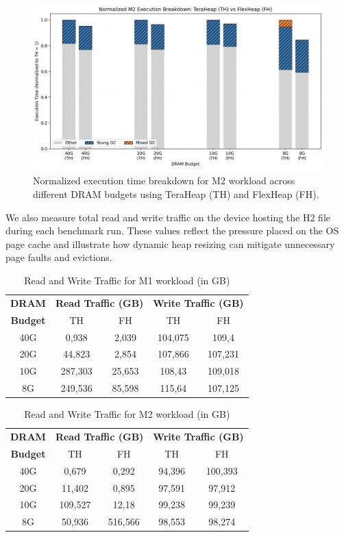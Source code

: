 \begin{figure}[htbp]
  \centering
  \includegraphics[width=0.95\linewidth]{fig/M2_exec.png}
  \caption{Normalized execution time breakdown for M2 workload across different DRAM budgets using TeraHeap (TH) and FlexHeap (FH).}
  \label{fig:m2-exec}
\end{figure}

We also measure total read and write traffic on the device hosting the H2 file during each benchmark run. 
These values reflect the pressure placed on the OS page cache and illustrate how dynamic heap resizing 
can mitigate unnecessary page faults and evictions.

\begin{table}[h]
\centering
\caption{Read and Write Traffic for M1 workload (in GB)}
\label{tab:m1-traffic}
\begin{tabular}{|c|cc|cc|}
\hline
\textbf{DRAM} & \multicolumn{2}{c|}{\textbf{Read Traffic (GB)}} & \multicolumn{2}{c|}{\textbf{Write Traffic (GB)}} \\
\textbf{Budget} & TH & FH & TH & FH \\
\hline
40G & 0,938 & 2,039 & 104,075  & 109,4 \\
20G & 44,823 & 2,854 & 107,866 & 107,231 \\
10G & 287,303 & 25,653 & 108,43 & 109,018 \\
8G  & 249,536 & 85,598 & 115,64 & 107,125 \\
\hline
\end{tabular}
\end{table}

\begin{table}[h]
\centering
\caption{Read and Write Traffic for M2 workload (in GB)}
\label{tab:m2-traffic}
\begin{tabular}{|c|cc|cc|}
\hline
\textbf{DRAM} & \multicolumn{2}{c|}{\textbf{Read Traffic (GB)}} & \multicolumn{2}{c|}{\textbf{Write Traffic (GB)}} \\
\textbf{Budget} & TH & FH & TH & FH \\
\hline
40G & 0,679 & 0,292 & 94,396  & 100,393 \\
20G & 11,402 & 0,895 & 97,591 & 97,912 \\
10G & 109,527 & 12,18 & 99,238 & 99,239 \\
8G  & 50,936 & 516,566 & 98,553 & 98,274 \\
\hline
\end{tabular}
\end{table}

\vspace{1em}

